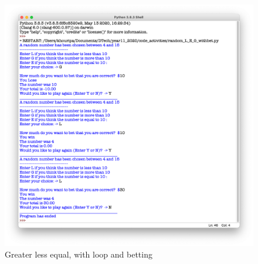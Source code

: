 \documentclass[a4paper,12pt]{article}
\begin{document}
\begin{figure} [!h]
	\centering
	\includegraphics[width=15cm]{iterative_processes/random_L_E_G_withbet.png}
	\caption*{Greater less equal, with loop and betting}
\end{figure}
\newpage
\end{document}
